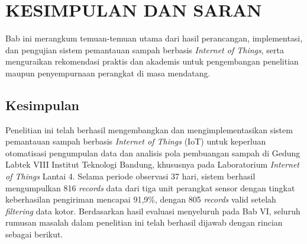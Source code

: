 \cleardoublepage
\chapter{KESIMPULAN DAN SARAN}
\label{chap:penutup}

Bab ini merangkum temuan-temuan utama dari hasil perancangan, implementasi, dan pengujian sistem pemantauan sampah berbasis \textit{Internet of Things}, serta menguraikan rekomendasi praktis dan akademis untuk pengembangan penelitian maupun penyempurnaan perangkat di masa mendatang.

\section{Kesimpulan}
\label{sec:kesimpulan}

Penelitian ini telah berhasil mengembangkan dan mengimplementasikan sistem pemantauan sampah berbasis \textit{Internet of Things} (IoT) untuk keperluan otomatisasi pengumpulan data dan analisis pola pembuangan sampah di Gedung Labtek VIII Institut Teknologi Bandung, khususnya pada Laboratorium \textit{Internet of Things} Lantai 4. Selama periode observasi 37 hari, sistem berhasil mengumpulkan 816 \textit{records} data dari tiga unit perangkat sensor dengan tingkat keberhasilan pengiriman mencapai 91,9\%, dengan 805 \textit{records} valid setelah \textit{filtering} data kotor. Berdasarkan hasil evaluasi menyeluruh pada Bab VI, seluruh rumusan masalah dalam penelitian ini telah berhasil dijawab dengan rincian sebagai berikut.

